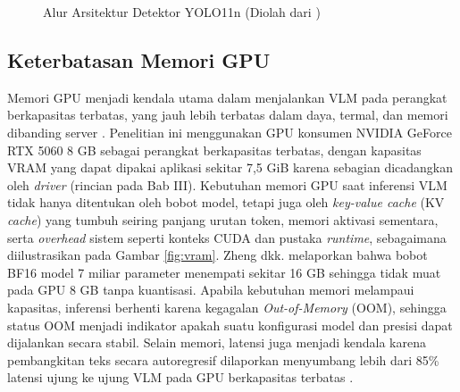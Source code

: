 \begin{figure}[htbp]
    \centering
    \caption{Alur Arsitektur Detektor YOLO11n (Diolah dari \cite{ref36})}
    \label{fig:yolo}
\end{figure}

\subsection{Keterbatasan Memori GPU}
Memori GPU menjadi kendala utama dalam menjalankan VLM pada perangkat berkapasitas terbatas, yang jauh lebih terbatas dalam daya, termal, dan memori dibanding server \cite{ref14}. Penelitian ini menggunakan GPU konsumen NVIDIA GeForce RTX 5060 8 GB sebagai perangkat berkapasitas terbatas, dengan kapasitas VRAM yang dapat dipakai aplikasi sekitar 7,5 GiB karena sebagian dicadangkan oleh \textit{driver} (rincian pada Bab III). Kebutuhan memori GPU saat inferensi VLM tidak hanya ditentukan oleh bobot model, tetapi juga oleh \textit{key-value cache} (KV \textit{cache}) yang tumbuh seiring panjang urutan token, memori aktivasi sementara, serta \textit{overhead} sistem seperti konteks CUDA dan pustaka \textit{runtime}, sebagaimana diilustrasikan pada Gambar \ref{fig:vram}. Zheng dkk. \cite{ref32} melaporkan bahwa bobot BF16 model 7 miliar parameter menempati sekitar 16 GB sehingga tidak muat pada GPU 8 GB tanpa kuantisasi. Apabila kebutuhan memori melampaui kapasitas, inferensi berhenti karena kegagalan \textit{Out-of-Memory} (OOM), sehingga status OOM menjadi indikator apakah suatu konfigurasi model dan presisi dapat dijalankan secara stabil. Selain memori, latensi juga menjadi kendala karena pembangkitan teks secara autoregresif dilaporkan menyumbang lebih dari 85\% latensi ujung ke ujung VLM pada GPU berkapasitas terbatas \cite{ref24}.


